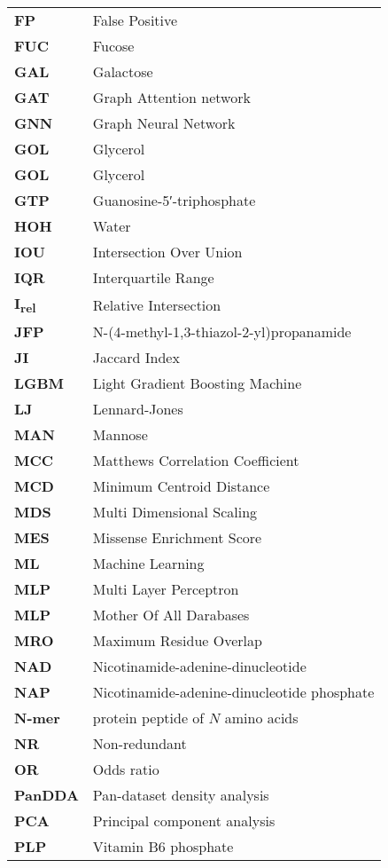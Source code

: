 \begin{longtable}[l]{@{}p{2.5cm}p{12cm}@{}}
\textbf{FP} & False Positive \\
\textbf{FUC} & Fucose \\
\textbf{GAL} & Galactose \\
\textbf{GAT} & Graph Attention network \\
\textbf{GNN} & Graph Neural Network \\
\textbf{GOL} & Glycerol \\
\textbf{GOL} & Glycerol \\
\textbf{GTP} & Guanosine-5′-triphosphate \\
\textbf{HOH} & Water \\
\textbf{IOU} & Intersection Over Union \\
\textbf{IQR} & Interquartile Range \\
\textbf{I\textsubscript{rel}} & Relative Intersection \\
\textbf{JFP} & N-(4-methyl-1,3-thiazol-2-yl)propanamide \\
\textbf{JI} & Jaccard Index \\
\textbf{LGBM} & Light Gradient Boosting Machine \\
\textbf{LJ} & Lennard-Jones \\
\textbf{MAN} & Mannose \\
\textbf{MCC} & Matthews Correlation Coefficient \\
\textbf{MCD} & Minimum Centroid Distance \\
\textbf{MDS} & Multi Dimensional Scaling \\
\textbf{MES} & Missense Enrichment Score \\
\textbf{ML} & Machine Learning \\
\textbf{MLP} & Multi Layer Perceptron \\
\textbf{MLP} & Mother Of All Darabases \\
\textbf{MRO} & Maximum Residue Overlap \\
\textbf{NAD} & Nicotinamide-adenine-dinucleotide \\
\textbf{NAP} & Nicotinamide-adenine-dinucleotide phosphate \\
\textbf{N-mer} & protein peptide of $N$ amino acids \\
\textbf{NR} & Non-redundant \\
\textbf{OR} & Odds ratio \\
\textbf{PanDDA} & Pan-dataset density analysis \\
\textbf{PCA} & Principal component analysis \\
\textbf{PLP} & Vitamin B6 phosphate \\

\end{longtable}
